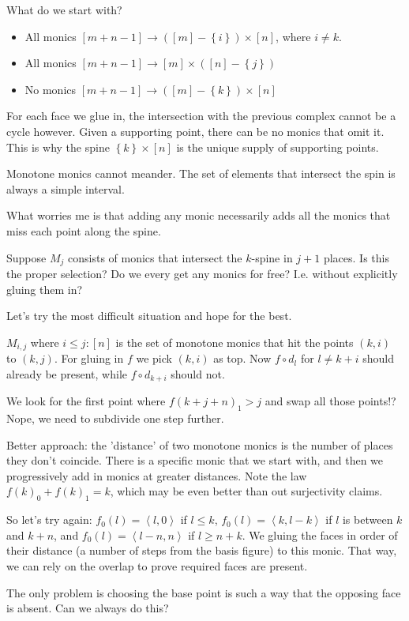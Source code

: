 \documentclass{tac}
\newcommand\set[1]{\left\{#1\right\}}
\newcommand\of{:}
\newcommand\tuplet[1]{\left\langle #1 \right\rangle}
\begin{document}
What do we start with?
\begin{itemize}
\item All monics $[m+n-1] \to ([m]-\set{i})\times[n]$, where $i\neq k$.
\item All monics $[m+n-1] \to [m]\times ([n]-\set{j})$
\item No monics $[m+n-1] \to ([m]-\set{k})\times[n]$
\end{itemize}
For each face we glue in, the intersection with the previous complex cannot be a cycle however.
Given a supporting point, there can be no monics that omit it.
This is why the spine $\set{k}\times[n]$ is the unique supply of supporting points.

Monotone monics cannot meander. The set of elements that intersect the spin is always a simple interval.

What worries me is that adding any monic necessarily adds all the monics that miss each point along the spine.

Suppose $M_j$ consists of monics that intersect the $k$-spine in $j+1$ places. Is this the proper selection?
Do we every get any monics for free? I.e. without explicitly gluing them in?

Let's try the most difficult situation and hope for the best.

$M_{i,j}$ where $i\leq j\of[n]$ is the set of monotone monics that hit the points $(k,i)$ to $(k,j)$.
For gluing in $f$ we pick $(k,i)$ as top. Now $f\circ d_l$ for $l\neq k+i$ should already be present, while
$f\circ d_{k+i}$ should not.

We look for the first point where $f(k+j+n)_1 > j$ and swap all those points!?
Nope, we need to subdivide one step further.

Better approach: the 'distance' of two monotone monics is the number of places they don't coincide.
There is a specific monic that we start with, and then we progressively add in monics at greater distances.
Note the law $f(k)_0+f(k)_1=k$, which may be even better than out surjectivity claims.

So let's try again: $f_0(l) = \tuplet{l,0}$ if $l\leq k$, $f_0(l) = \tuplet{k,l-k}$ if $l$ is between $k$ and $k+n$, and 
$f_0(l) = \tuplet{l-n,n}$ if $l\geq n+k$. We gluing the faces in order of their distance (a number of steps from the basis figure)
to this monic. That way, we can rely on the overlap to prove required faces are present.

The only problem is choosing the base point is such a way that the opposing face is absent. Can we always do this?
\end{document}
